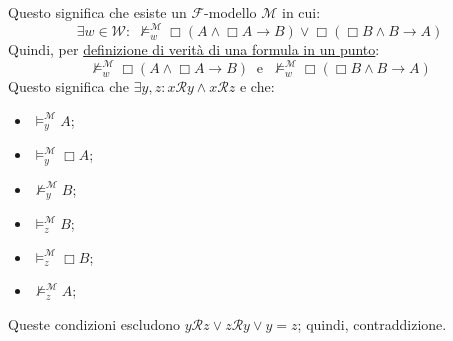 \documentclass[a4paper,12pt]{article}
\begin{document}
\begin{dimo}
\begin{enumerate}
		      Questo significa che esiste un $\mathcal{F}$-modello $\mathcal{M}$ in cui:
		      $$\exists w \in \mathcal{W} : \; \nvDash_w^{\mathcal{M}} \Box(A \land \Box A \to B) \lor \Box (\Box B \land B \to A)$$
		      Quindi, per \hyperlink{defverp}{definizione di verità di una formula in un punto}:
		      $$\nvDash_w^{\mathcal{M}} \Box(A \land \Box A \to B) \;\; \text{e} \;\; \nvDash_w^{\mathcal{M}} \Box (\Box B \land B \to A)$$
		      Questo significa che $\exists y, z : x\mathcal{R}y \land x\mathcal{R}z$ e che:
		      \begin{itemize}
			      \item $\vDash_y^{\mathcal{M}} A$;
			      \item $\vDash_y^{\mathcal{M}} \Box A$;
			      \item $\nvDash_y^{\mathcal{M}} B$;
			      \item $\vDash_z^{\mathcal{M}} B$;
			      \item $\vDash_z^{\mathcal{M}} \Box B$;
			      \item $\nvDash_z^{\mathcal{M}} A$;
		      \end{itemize}
		      Queste condizioni escludono $y\mathcal{R}z \lor z\mathcal{R}y \lor y=z$; quindi,  contraddizione.
	\end{enumerate}
\end{dimo}
\end{document}
